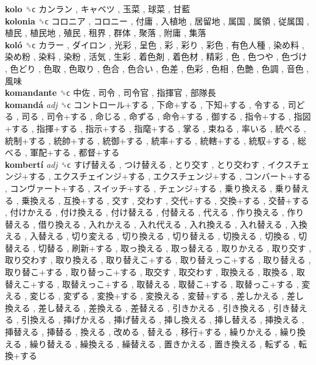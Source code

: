 \textbf{kolo} ␝ϲ   カンラン ,  キャベツ ,  玉菜 ,  球菜 ,  甘藍   \\
\textbf{kolonia} ␝ϲ   コロニア ,  コロニー ,  付庸 ,  入植地 ,  居留地 ,  属国 ,  属領 ,  従属国 ,  植民 ,  植民地 ,  殖民 ,  租界 ,  群体 ,  聚落 ,  附庸 ,  集落   \\
\textbf{koló} ␝ϲ   カラー ,  ダイロン ,  光彩 ,  呈色 ,  彩 ,  彩り ,  彩色 ,  有色人種 ,  染め料 ,  染め粉 ,  染料 ,  染粉 ,  活気 ,  生彩 ,  着色剤 ,  着色材 ,  精彩 ,  色 ,  色つや ,  色づけ ,  色どり ,  色取 ,  色取り ,  色合 ,  色合い ,  色差 ,  色彩 ,  色相 ,  色艶 ,  色調 ,  音色 ,  風味   \\
\textbf{komandante} ␝ϲ   中佐 ,  司令 ,  司令官 ,  指揮官 ,  部隊長   \\
\textbf{komandá} \emph{adj}  ␝ϲ   コントロール+する ,  下命+する ,  下知+する ,  令する ,  司どる ,  司る ,  司令+する ,  命じる ,  命ずる ,  命令+する ,  御する ,  指令+する ,  指図+する ,  指揮+する ,  指示+する ,  指麾+する ,  掌る ,  束ねる ,  率いる ,  統べる ,  統制+する ,  統帥+する ,  統御+する ,  統率+する ,  統轄+する ,  統馭+する ,  総べる ,  軍配+する ,  都督+する   \\
\textbf{kombertí} \emph{adj}  ␝ϲ   すげ替える ,  つけ替える ,  とり交す ,  とり交わす ,  イクスチェンジ+する ,  エクスチェインジ+する ,  エクスチェンジ+する ,  コンバート+する ,  コンヴァート+する ,  スイッチ+する ,  チェンジ+する ,  乗り換える ,  乗り替える ,  乗換える ,  互換+する ,  交す ,  交わす ,  交代+する ,  交換+する ,  交替+する ,  付けかえる ,  付け換える ,  付け替える ,  付替える ,  代える ,  作り換える ,  作り替える ,  借り換える ,  入れかえる ,  入れ代える ,  入れ換える ,  入れ替える ,  入換える ,  入替える ,  切り変える ,  切り換える ,  切り替える ,  切換える ,  切換る ,  切替える ,  切替る ,  刷新+する ,  取っ換える ,  取っ替える ,  取りかえる ,  取り交す ,  取り交わす ,  取り換える ,  取り替えこ+する ,  取り替えっこ+する ,  取り替える ,  取り替こ+する ,  取り替っこ+する ,  取交す ,  取交わす ,  取換える ,  取換る ,  取替えこ+する ,  取替えっこ+する ,  取替える ,  取替こ+する ,  取替っこ+する ,  変える ,  変じる ,  変ずる ,  変換+する ,  変換える ,  変替+する ,  差しかえる ,  差し換える ,  差し替える ,  差換える ,  差替える ,  引きかえる ,  引き換える ,  引き替える ,  引換える ,  挿げかえる ,  挿げ替える ,  挿し換える ,  挿し替える ,  挿換える ,  挿替える ,  挿替る ,  換える ,  改める ,  替える ,  移行+する ,  繰りかえる ,  繰り換える ,  繰り替える ,  繰換える ,  繰替える ,  置きかえる ,  置き換える ,  転ずる ,  転換+する   \\
